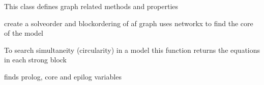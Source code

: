 \documentclass[letterpaper,10pt,english]{sphinxmanual}
\begin{document}
\begin{fulllineitems}
\label{\detokenize{index:modelclass.Graph_Mixin}}
\pysigstartsignatures
{}
\pysigstopsignatures
\sphinxAtStartPar
This class defines graph related methods and properties

\begin{fulllineitems}
\label{\detokenize{index:modelclass.Graph_Mixin.create_strong_network}}
\pysigstartsignatures
{}
\pysigstopsignatures
\sphinxAtStartPar
create a solveorder and   blockordering of af graph
uses networkx to find the core of the model

\end{fulllineitems}


\begin{fulllineitems}
\label{\detokenize{index:modelclass.Graph_Mixin.strongfrml}}
\pysigstartsignatures
{}
\pysigstopsignatures
\sphinxAtStartPar
To search simultaneity (circularity) in a model
this function returns the equations in each strong block

\end{fulllineitems}


\begin{fulllineitems}
\label{\detokenize{index:modelclass.Graph_Mixin.superblock}}
\pysigstartsignatures
{}
\pysigstopsignatures
\sphinxAtStartPar
finds prolog, core and epilog variables


\end{fulllineitems}
\end{fulllineitems}
\end{document}

